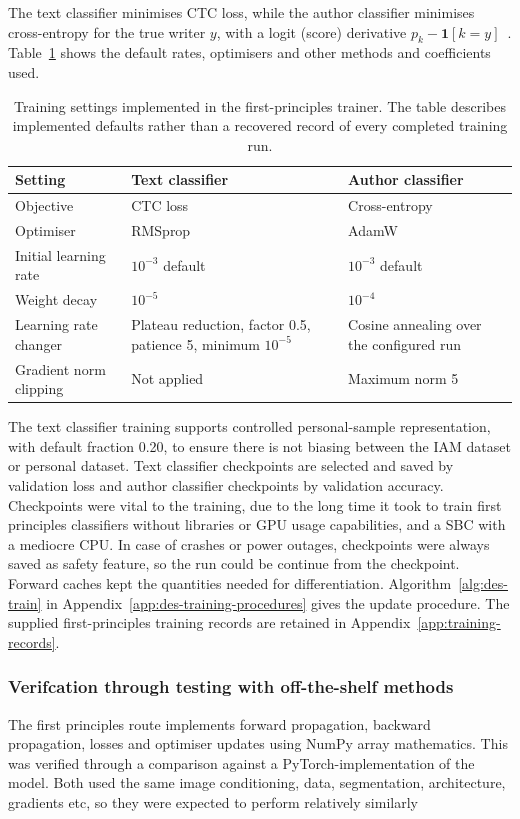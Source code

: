 The text classifier minimises CTC loss, while the author classifier minimises cross-entropy for the true writer $y$, with a logit (score) derivative $p_k-\mathbf1[k=y]$~\cite[p.~6]{graves2013}. Table~\ref{tab:des-training} shows the default rates, optimisers and other methods and coefficients used.
\begin{table}[!htbp]\centering\small
\begin{tabularx}{\linewidth}{|l|X|X|}
\hline\textbf{Setting}&\textbf{Text classifier}&\textbf{Author classifier}\\\hline
Objective&CTC loss&Cross-entropy\\\hline
Optimiser&RMSprop&AdamW\\\hline
Initial learning rate&$10^{-3}$ default&$10^{-3}$ default\\\hline
Weight decay&$10^{-5}$&$10^{-4}$\\\hline
Learning rate changer&Plateau reduction, factor 0.5, patience 5, minimum $10^{-5}$&Cosine annealing over the configured run\\\hline
Gradient norm clipping&Not applied&Maximum norm 5\\\hline
\end{tabularx}
\caption{Training settings implemented in the first-principles trainer. The table describes implemented defaults rather than a recovered record of every completed training run.}
\label{tab:des-training}
\end{table}

The text classifier training supports controlled personal-sample representation, with default fraction 0.20, to ensure there is not biasing between the IAM dataset or personal dataset. Text classifier checkpoints are selected and saved by validation loss and author classifier checkpoints by validation accuracy. Checkpoints were vital to the training, due to the long time it took to train first principles classifiers without libraries or GPU usage capabilities, and a SBC with a mediocre CPU. In case of crashes or power outages, checkpoints were always saved as safety feature, so the run could be continue from the checkpoint. Forward caches kept the quantities needed for differentiation. Algorithm~\ref{alg:des-train} in Appendix~\ref{app:des-training-procedures} gives the update procedure. The supplied first-principles training records are retained in Appendix~\ref{app:training-records}.

\subsubsection{Verifcation through testing with off-the-shelf methods}
\label{sec:des-implementations}
The first principles route implements forward propagation, backward propagation, losses and optimiser updates using NumPy array mathematics. This was verified through a comparison against a PyTorch-implementation of the model. Both used the same image conditioning, data, segmentation, architecture, gradients etc, so they were expected to perform relatively similarly

